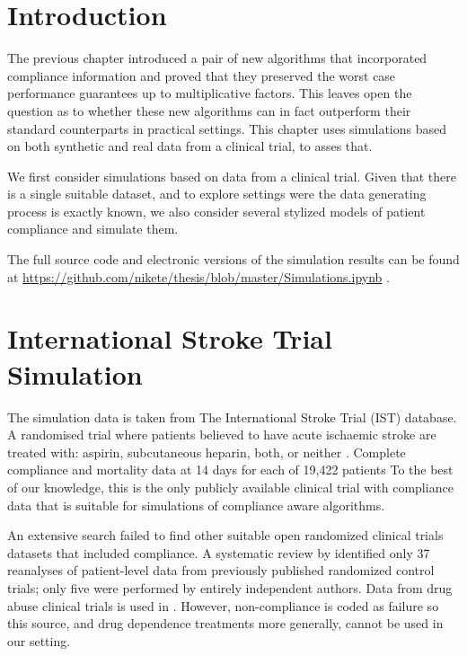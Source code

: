 
\section{Introduction}

The previous chapter introduced a pair of new algorithms that incorporated compliance information and proved that they preserved the worst case performance guarantees up to multiplicative factors.
This leaves open the question as to whether these new algorithms can in fact outperform their standard counterparts in practical settings. 
This chapter uses simulations based on both synthetic and real data from a clinical trial, to asses that.

We first consider simulations based on data from a clinical trial. Given that there is a single suitable dataset, and to explore settings were the data generating process is exactly known, we also consider several stylized models of patient compliance and simulate them.

The full source code and electronic versions of the simulation results can be found at \url{https://github.com/nikete/thesis/blob/master/Simulations.ipynb} .

\section{International Stroke Trial Simulation}
\label{sec:data}

The simulation data is taken from The International Stroke Trial (IST) database. A randomised trial where patients believed to have acute ischaemic stroke are treated with: aspirin, subcutaneous heparin, both, or neither \cite{ist:97}.
Complete compliance and mortality data at 14 days for each of 19,422 patients
To the best of our knowledge, this is the only publicly available clinical trial with compliance data that is suitable for simulations of compliance aware algorithms.

An extensive search failed to find other suitable open randomized clinical trials datasets that included compliance. A systematic review by  \cite{ebrahim:14} identified only 37 reanalyses of patient-level data from previously published randomized control trials; only five were performed by entirely independent authors.
Data from drug abuse clinical trials is used in \cite{kuleshov:14}. However, non-compliance is coded as failure so this source, and drug dependence treatments more generally, cannot be used in our setting.  

